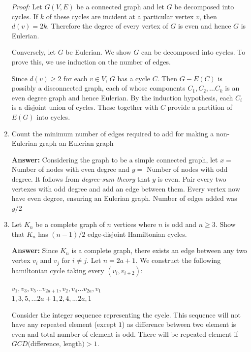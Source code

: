 \begin{enumerate}
{        \textit{Proof:} Let $G(V, E)$ be a connected graph and let $G$ be decomposed into cycles. If $k$ of these cycles are incident at a particular vertex $v$, then $d(v) = 2k$. Therefore the degree of every vertex of $G$ is even and hence $G$ is Eulerian.
        
        Conversely, let $G$ be Eulerian. We show $G$ can be decomposed into cycles. To prove this, we use induction on the number of edges.
        
        Since $d(v)\ge 2$ for each $v \in V$, $G$ has a cycle $C$. Then $G-E(C)$ is possibly a disconnected graph, each of whose components $C_1, C_2, ... C_k$ is an even degree graph and hence Eulerian. By the induction hypothesis, each $C_i$ is a disjoint union of cycles. These together with $C$ provide a partition of $E(G)$ into cycles. \cite[p.~65]{tdk_chap_03}
        
    }
    \item {
        Count the minimum number of edges required to add for making a non-Eulerian graph an Eulerian graph
    
        \textbf{Answer: } Considering the graph to be a simple connected graph, let $x = $ Number of nodes with even degree and $y = $ Number of nodes with odd degree. It follows from \textit{degree-sum theory} that $y$ is even. Pair every two vertexes with odd degree and add an edge between them. Every vertex now have even degree, ensuring an Eulerian graph. Number of edges added was $y/2$
    }
    \item {
        Let $K_n$ be a complete graph of $n$ vertices where $n$ is odd and $n \ge 3$. Show that $K_n$ has $(n-1)/2$ edge-disjoint Hamiltonian cycles.
        
        \textbf{Answer:} Since $K_n$ is a complete graph, there exists an edge between any two vertex $v_i$ and $v_j$ for $i \ne j$. Let $n = 2a+1$. We construct the following hamiltonian cycle taking every $(v_i, v_{i+2})$: 
                
        $v_1, v_3, v_5 ... v_{2a+1}, v_2, v_4 ... v_{2a}, v_1$ \\
        $1, 3, 5, ... 2a+1, 2, 4, ... 2a, 1$
        
        Consider the integer sequence representing the cycle. This sequence will not have any repeated element (except $1$) as difference between two element is even and total number of element is odd. There will be repeated element if $GCD($difference, length$) > 1$.
        
}
\end{enumerate}
